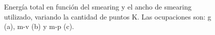   \begin{figure}[H]
      \centering
      \caption{Energía total en función del smearing y el ancho de smearing utilizado, variando la cantidad de puntos K. Las ocupaciones son: g (a), m-v (b) y m-p (c).}
  \end{figure}

